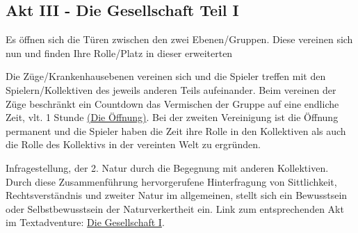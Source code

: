\documentclass[12pt, a4paper, openany]{report}
\let\tempone\itemize
\let\temptwo\enditemize
\renewenvironment{itemize}{\tempone\addtolength{\itemsep}{-0.5\baselineskip}}{\temptwo}
\begin{document}
\subsection{Akt III - Die Gesellschaft Teil I}
\begin{itemize}
  \item[R] Es öffnen sich die Türen zwischen den zwei Ebenen/Gruppen. Diese vereinen sich nun und finden Ihre Rolle/Platz in dieser erweiterten 
\item[SR] Die Züge/Krankenhausebenen vereinen sich und die Spieler treffen mit den Spielern/Kollektiven des jeweils anderen Teils aufeinander. 
Beim vereinen der Züge beschränkt ein Countdown das Vermischen der Gruppe auf eine endliche Zeit, vlt. 1 Stunde \hyperref[die-öffnung]{(Die Öffnung)}. 
Bei der zweiten Vereinigung ist die Öffnung permanent und die Spieler haben die Zeit ihre Rolle in den Kollektiven als auch die Rolle des Kollektivs in der vereinten Welt zu ergründen.
\item[M]
\item[P] Infragestellung, der 2. Natur durch die Begegnung mit anderen Kollektiven.
Durch diese Zusammenführung hervorgerufene Hinterfragung von Sittlichkeit, Rechtsverständnis und zweiter Natur im allgemeinen, stellt sich ein Bewusstsein oder Selbstbewusstsein der Naturverkertheit ein. 
\end{itemize}
Link zum entsprechenden Akt im Textadventure: \hyperref[die-gesellschaft]{Die Gesellschaft I}.
\end{document}
